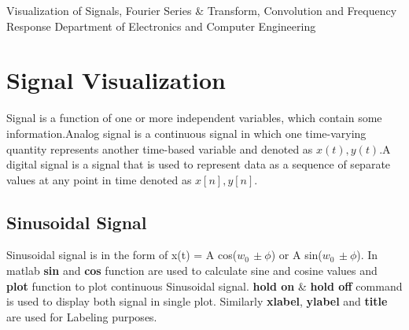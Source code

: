 \documentclass{article}
\begin{document}
{Visualization of Signals, Fourier Series \& Transform, Convolution and Frequency Response}
{Department of Electronics and Computer Engineering}




\tableofcontents
\vspace{1in}
\listoffigures
\vspace{1in}
\lstlistoflistings
\pagebreak
{}






\section{Signal Visualization}
Signal is a function of one or more independent variables, which contain some information.Analog signal is a continuous signal in which one time-varying quantity represents another time-based variable and denoted as $x(t), y(t)$.A digital signal is a signal that is used to represent data as a sequence of separate values at any point in time denoted as $ x[n], y[n]$.


\subsection{Sinusoidal Signal}
Sinusoidal signal is in the form of x(t) = A cos(${w}_{0}\,\pm \phi$) or A sin(${w}_{0}\,\pm \phi$).
In matlab \textbf{sin} and \textbf{cos} function are used to calculate sine and cosine values and \textbf{plot} function to plot continuous Sinusoidal signal. \textbf{hold on} \& \textbf{hold off} command is used to display both signal in single plot. Similarly \textbf{xlabel}, \textbf{ylabel} and \textbf{title} are used for Labeling purposes.
\end{document}
